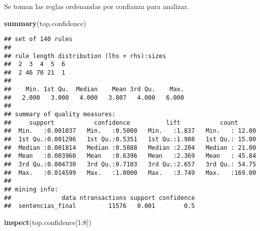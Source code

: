 \documentclass[runningheads,a4paper]{llncs}
\newenvironment{Shaded}{\footnotesize}{}
\newcommand{\KeywordTok}[1]{\textcolor[rgb]{0.00,0.44,0.13}{\textbf{{#1}}}}
\newcommand{\DecValTok}[1]{\textcolor[rgb]{0.25,0.63,0.44}{{#1}}}
\newcommand{\NormalTok}[1]{{#1}}
\newcommand{\OperatorTok}[1]{\textcolor[rgb]{0.40,0.40,0.40}{{#1}}}
\begin{document}
\normalsize

Se toman las reglas ordenandas por confianza para analizar.

\scriptsize

\begin{Shaded}
\begin{Highlighting}[]
\KeywordTok{summary}\NormalTok{(top.confidence)}
\end{Highlighting}
\end{Shaded}

\begin{verbatim}
## set of 140 rules
## 
## rule length distribution (lhs + rhs):sizes
##  2  3  4  5  6 
##  2 46 70 21  1 
## 
##    Min. 1st Qu.  Median    Mean 3rd Qu.    Max. 
##   2.000   3.000   4.000   3.807   4.000   6.000 
## 
## summary of quality measures:
##     support           confidence          lift           count       
##  Min.   :0.001037   Min.   :0.5000   Min.   :1.837   Min.   : 12.00  
##  1st Qu.:0.001296   1st Qu.:0.5351   1st Qu.:1.988   1st Qu.: 15.00  
##  Median :0.001814   Median :0.5888   Median :2.204   Median : 21.00  
##  Mean   :0.003960   Mean   :0.6396   Mean   :2.369   Mean   : 45.84  
##  3rd Qu.:0.004730   3rd Qu.:0.7103   3rd Qu.:2.657   3rd Qu.: 54.75  
##  Max.   :0.014599   Max.   :1.0000   Max.   :3.749   Max.   :169.00  
## 
## mining info:
##              data ntransactions support confidence
##  sentencias_final         11576   0.001        0.5
\end{verbatim}

\begin{Shaded}
\begin{Highlighting}[]
\KeywordTok{inspect}\NormalTok{(top.confidence[}\DecValTok{1}\OperatorTok{:}\DecValTok{8}\NormalTok{])}
\end{Highlighting}
\end{Shaded}
\end{document}
